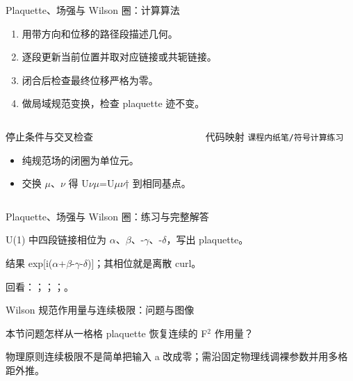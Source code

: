 \begin{frame}[t]{Plaquette、场强与 Wilson 圈：计算算法}
\footnotesize
{}\begin{enumerate}
\item 用带方向和位移的路径段描述几何。
\item 逐段更新当前位置并取对应链接或共轭链接。
\item 闭合后检查最终位移严格为零。
\item 做局域规范变换，检查 plaquette 迹不变。
\end{enumerate}\begin{columns}[T,onlytextwidth]
\begin{block}{停止条件与交叉检查}\scriptsize\begin{itemize}
\item[\CheckMark] 纯规范场的闭圈为单位元。
\item[\CheckMark] 交换 \ensuremath{\mu}、\ensuremath{\nu} 得 U\ensuremath{\nu}\ensuremath{\mu}=U\ensuremath{\mu}\ensuremath{\nu}† 到相同基点。
\end{itemize}\end{block}
\begin{block}{代码映射}
\scriptsize \texttt{课程内纸笔/\allowbreak{}符号计算练习}
\end{block}\end{columns}\end{frame}

\begin{frame}[t]{Plaquette、场强与 Wilson 圈：练习与完整解答}
\footnotesize
\begin{block}{}U(1) 中四段链接相位为 \ensuremath{\alpha}、\ensuremath{\beta}、-\ensuremath{\gamma}、-\ensuremath{\delta}，写出 plaquette。\end{block}
\begin{exampleblock}{}结果 exp[i(\ensuremath{\alpha}+\ensuremath{\beta}-\ensuremath{\gamma}-\ensuremath{\delta})]；其相位就是离散 curl。\end{exampleblock}
\vfill
\scriptsize 回看：；；；。
\end{frame}

\begin{frame}[t]{Wilson 规范作用量与连续极限：问题与图像}
\footnotesize
\begin{block}{本节问题}怎样从一格格 plaquette 恢复连续的 F\ensuremath{^{2}} 作用量？\end{block}
\begin{block}{物理原则}\quad 连续极限不是简单把输入 a 改成零；需沿固定物理线调裸参数并用多格距外推。\end{block}
\end{frame}


